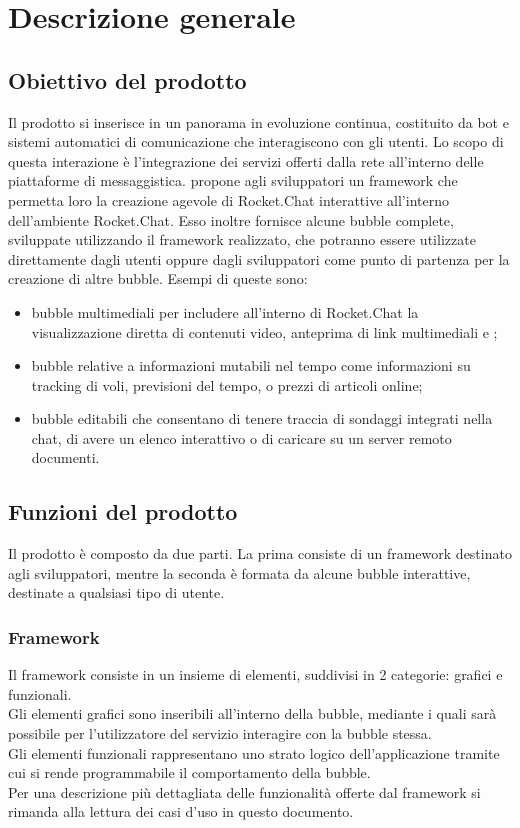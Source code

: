 \section{Descrizione generale}
\subsection{Obiettivo del prodotto}
Il prodotto si inserisce in un panorama in evoluzione continua, costituito da bot e sistemi automatici di comunicazione che interagiscono con gli utenti.
Lo scopo di  questa interazione è l'integrazione dei servizi offerti dalla rete all'interno delle piattaforme di messaggistica. 
\ProjectName{} propone agli sviluppatori un framework che permetta loro la creazione agevole di Rocket.Chat interattive all'interno dell'ambiente Rocket.Chat. Esso inoltre fornisce alcune bubble complete, sviluppate utilizzando il framework realizzato, che potranno essere utilizzate direttamente dagli utenti oppure dagli sviluppatori come punto di partenza per la creazione di altre bubble.
Esempi di queste sono: 
\begin{itemize}
	\item bubble multimediali per includere all'interno di Rocket.Chat la visualizzazione diretta di contenuti video, anteprima di link multimediali e ;
	\item bubble relative a informazioni mutabili nel tempo come informazioni su tracking di voli, previsioni del tempo, o prezzi di articoli online;
	\item bubble editabili che consentano di tenere traccia di sondaggi integrati nella chat, di avere un elenco interattivo o di caricare su un server remoto documenti.
\end{itemize}

\subsection{Funzioni del prodotto}
Il prodotto è composto da due parti. La prima consiste di un framework destinato agli sviluppatori, mentre la seconda è formata da alcune bubble interattive, destinate a qualsiasi tipo di utente.

\subsubsection{Framework}
Il framework consiste in un insieme di elementi, suddivisi in 2 categorie: grafici e funzionali.\\
Gli elementi grafici sono  inseribili all'interno della bubble, mediante i quali sarà possibile per l'utilizzatore del servizio interagire con la bubble stessa.\\
Gli elementi funzionali rappresentano uno strato logico dell'applicazione tramite cui si rende programmabile il comportamento della bubble.\\
Per una descrizione più dettagliata delle funzionalità offerte dal framework si rimanda alla lettura dei casi d'uso in questo documento.

